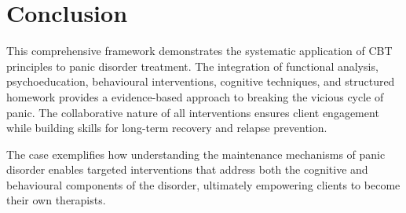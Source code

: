 \documentclass[
  american,
  11pt,
  11pt,
  letterpaper,
  onecolumn]{article}
\begin{document}
\section{Conclusion}\label{conclusion}

This comprehensive framework demonstrates the systematic application of
CBT principles to panic disorder treatment. The integration of
functional analysis, psychoeducation, behavioural interventions,
cognitive techniques, and structured homework provides a evidence-based
approach to breaking the vicious cycle of panic. The collaborative
nature of all interventions ensures client engagement while building
skills for long-term recovery and relapse prevention.

The case exemplifies how understanding the maintenance mechanisms of
panic disorder enables targeted interventions that address both the
cognitive and behavioural components of the disorder, ultimately
empowering clients to become their own therapists.


\printbibliography
\end{document}
